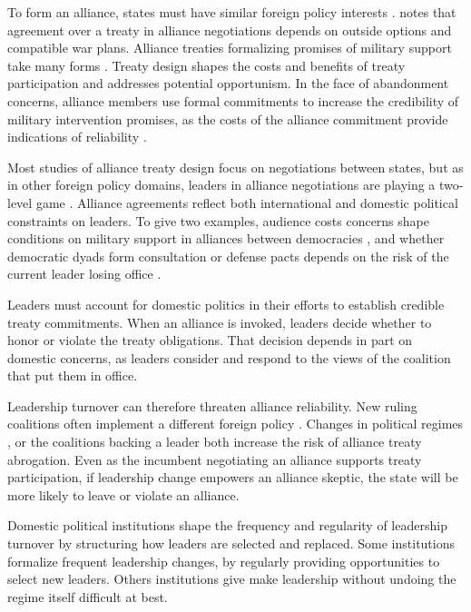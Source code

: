 \documentclass[12pt]{article}
\begin{document}
To form an alliance, states must have similar foreign policy interests \citep{Morrow1991, Smith1995, FordhamPoast2014}. 
\citep{Poast2019a} notes that agreement over a treaty in alliance negotiations depends on outside options and compatible war plans. 
Alliance treaties formalizing promises of military support take many forms \citep{Leedsetal2002, BensonClinton2016}. 
Treaty design shapes the costs and benefits of treaty participation and addresses potential opportunism.  
In the face of abandonment concerns, alliance members use formal commitments to increase the credibility of military intervention promises, as the costs of the alliance commitment provide indications of reliability \citep{Morrow2000}.


Most studies of alliance treaty design focus on negotiations between states, but as in other foreign policy domains, leaders in alliance negotiations are playing a two-level game \citep{Putnam1988}. 
Alliance agreements reflect both international and domestic political constraints on leaders. 
To give two examples, audience costs concerns shape conditions on military support in alliances between democracies \citep{Chibaetal2015, FjelstulReiter2019}, and whether democratic dyads form consultation or defense pacts depends on the risk of the current leader losing office \citep{Mattes2012a}. 


Leaders must account for domestic politics in their efforts to establish credible treaty commitments.
When an alliance is invoked, leaders decide whether to honor or violate the treaty obligations. 
That decision depends in part on domestic concerns, as leaders consider and respond to the views of the coalition that put them in office. 


Leadership turnover can therefore threaten alliance reliability.
New ruling coalitions often implement a different foreign policy \citep{Lobell2004, Narizny2007}.  
Changes in political regimes \citep{LeedsSavun2007}, or the coalitions backing a leader \citep{Leedsetal2009} both increase the risk of alliance treaty abrogation. 
Even as the incumbent negotiating an alliance supports treaty participation, if leadership change empowers an alliance skeptic, the state will be more likely to leave or violate an alliance.  


Domestic political institutions shape the frequency and regularity of leadership turnover by structuring how leaders are selected and replaced. 
Some institutions formalize frequent leadership changes, by regularly providing opportunities to select new leaders. 
Others institutions give make leadership without undoing the regime itself difficult at best. 
\end{document}
